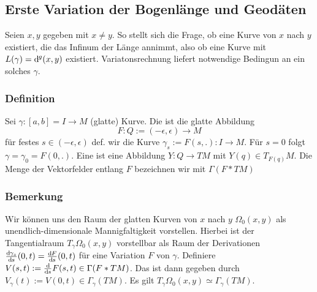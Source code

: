 
\subsection{Erste Variation der Bogenlänge und Geodäten}

Seien $x,y$ gegeben mit $x\neq y$. So stellt sich die Frage, ob eine Kurve von $x$ nach $y$ existiert, die das Infinum der Länge annimmt, also ob eine Kurve mit $L(\gamma) = \mathrm{d}\mkern-1.0mu^g (x,y)$ existiert. Variatonsrechnung liefert notwendige Bedingun an ein solches $\gamma$.

\subsubsection{Definition}
\label{ssub:232}
Sei $\gamma:[a,b]=I\to M$ (glatte) Kurve. Die  ist die glatte Abbildung 
\[
F:Q:=(-\epsilon,\epsilon) \to M
\] für festes $s\in (-\epsilon,\epsilon)$ def. wir die Kurve $\gamma_s := F(s,.):I\to M$. Für $s=0$ folgt $\gamma = \gamma_0 = F(0,.)$. Eine  ist eine Abbildung $Y: Q\to TM$ mit $Y(q)\in T_{F(q)} M$. Die Menge der Vektorfelder entlang $F$ bezeichnen wir mit $\Gamma(F* TM)$

\subsubsection{Bemerkung}
\label{ssub:233}
Wir können uns den Raum der glatten Kurven von $x$ nach $y$ $\Omega_0 (x,y)$ als unendlich-dimensionale Mannigfaltigkeit vorstellen. Hierbei ist der Tangentialraum $T_\gamma \Omega_0 (x,y)$ vorstellbar als Raum der Derivationen $\frac{\mathrm{d}\mkern-1.0mu \gamma_s}{\mathrm{d}\mkern-1.0mu s}(0,t) = \frac{\mathrm{d}\mkern-1.0mu F}{\mathrm{d}\mkern-1.0mu s}(0,t)$ für eine Variation $F$ von $\gamma$. Definiere $V(s,t) := \frac{\mathrm{d}\mkern-1.0mu}{\mathrm{d}\mkern-1.0mu s} F(s,t)\in \Gamma(F*TM)$. Das  ist dann gegeben durch $V_\gamma(t):=V(0,t) \in \Gamma_\gamma(TM)$. Es gilt $T_\gamma \Omega_0 (x,y) \simeq \Gamma_\gamma(TM)$.

